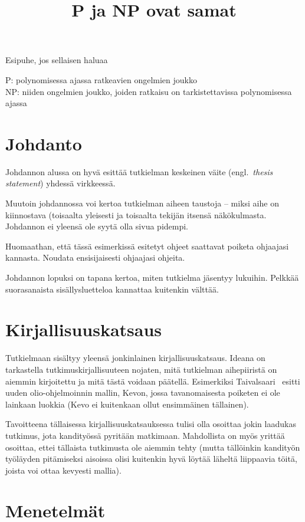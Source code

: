 \documentclass[finnish,utf8,nonumbib,palatino,kandi]{gradu3}
\title{P ja NP ovat samat}
\begin{document}
\preface
Esipuhe, jos sellaisen haluaa

\termlist
P: polynomisessa ajassa ratkeavien ongelmien joukko \\
NP: niiden ongelmien joukko, joiden ratkaisu on tarkistettavissa polynomisessa ajassa

\mainmatter

\section{Johdanto}

Johdannon alussa on hyvä esittää tutkielman keskeinen väite
(engl.~\emph{thesis statement}) yhdessä virkkeessä.

Muutoin johdannossa voi kertoa tutkielman aiheen taustoja -- miksi
aihe on kiinnostava (toisaalta yleisesti ja toisaalta tekijän itsensä
näkökulmasta.  Johdannon ei yleensä ole syytä olla sivua pidempi.

Huomaathan, että tässä esimerkissä esitetyt ohjeet saattavat poiketa
ohjaajasi kannasta.  Noudata ensisijaisesti ohjaajasi ohjeita.

Johdannon lopuksi on tapana kertoa, miten tutkielma jäsentyy lukuihin.
Pelkkää suorasanaista sisällysluetteloa kannattaa kuitenkin välttää.

\section{Kirjallisuuskatsaus}

Tutkielmaan sisältyy yleensä jonkinlainen kirjallisuuskatsaus.  Ideana
on tarkastella tutkimuskirjallisuuteen nojaten, mitä tutkielman
aihepiiristä on aiemmin kirjoitettu ja mitä tästä voidaan päätellä.
Esimerkiksi
Taivalsaari~\cite{taivalsaari93:_critic_view_inher_reusab_objec_progr}
esitti uuden olio-ohjelmoinnin mallin, Kevon, jossa tavanomaisesta
poiketen ei ole lainkaan luokkia (Kevo ei kuitenkaan ollut ensimmäinen
tällainen).

Tavoitteena tällaisessa kirjallisuuskatsauksessa tulisi olla osoittaa
jokin laadukas tutkimus, jota kandityössä pyritään matkimaan.
Mahdollista on myös yrittää osoittaa, ettei tällaista tutkimusta ole
aiemmin tehty (mutta tällöinkin kandityön työläyden pitämiseksi
aisoissa olisi kuitenkin hyvä löytää läheltä liippaavia töitä, joista
voi ottaa kevyesti mallia).

\section{Menetelmät}
\end{document}
